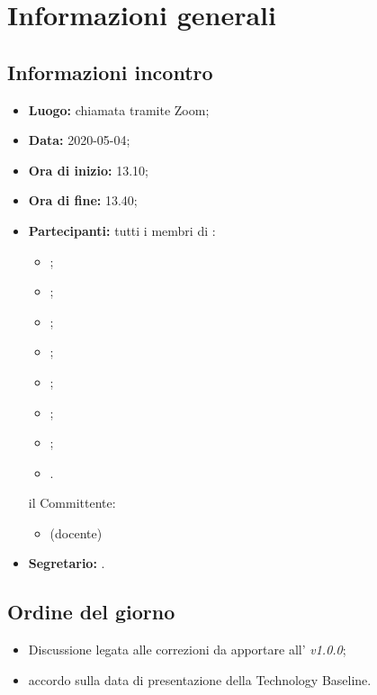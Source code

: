 \section{Informazioni generali}
\subsection{Informazioni incontro}
\begin{itemize}
	\item \textbf{Luogo:} chiamata tramite Zoom;
	\item \textbf{Data:} 2020-05-04;
	\item \textbf{Ora di inizio:} 13.10;
	\item \textbf{Ora di fine:} 13.40;
	\item \textbf{Partecipanti:}
		tutti i membri di \Gruppo:
		\begin{itemize}
			\item \VB;
			\item \LB;
			\item \NF;
			\item \EG;
			\item \FJ;
			\item \MP;
			\item \AS;
			\item \AZ.
		\end{itemize}
		il Committente:
		\begin{itemize}
			\item \RC{} (docente)
		\end{itemize}
	\item \textbf{Segretario:} \AS.
\end{itemize}

\subsection{Ordine del giorno}
\begin{itemize}
	\item Discussione legata alle correzioni da apportare all'\AdR{} \textit{v1.0.0};
	\item accordo sulla data di presentazione della Technology Baseline.
\end{itemize}
